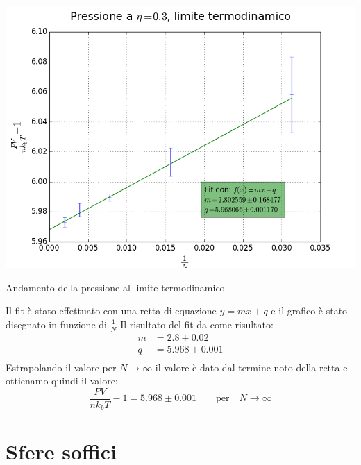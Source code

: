 \begin{myfig}[h]
	\includegraphics[scale=0.58]{sfere3D/lim_therm.png}
	\caption{Andamento della pressione al limite termodinamico}
\end{myfig}
Il fit è stato effettuato con una retta di equazione $y=mx +q$ e il grafico è stato disegnato in funzione di $\frac{1}{N}$
	Il risultato del fit da come risultato:
\begin{align}
	m &= 2.8 \pm 0.02\\	
	q &= 5.968 \pm 0.001\\
\end{align}
Estrapolando il valore per $N \rightarrow \infty$ il valore è dato dal termine noto della retta e ottienamo quindi il valore:
$$
	\frac{P V}{n k_b T} -1 = 5.968 \pm 0.001 \qquad \mbox{per} \quad N \rightarrow \infty
$$



\chapter{Sfere soffici}
